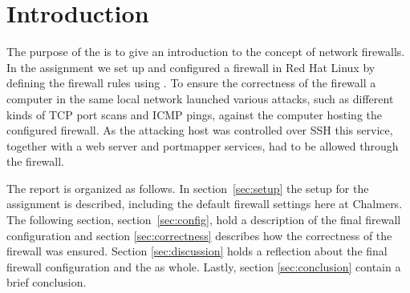 \section{Introduction} 
\label{sec:intro}

The purpose of the \lab{} is to give an introduction to the concept of network firewalls. In the assignment we set up and configured a firewall in Red Hat Linux by defining the firewall rules using . To ensure the correctness of the firewall a computer in the same local network launched various attacks, such as different kinds of TCP port scans and ICMP pings, against the computer hosting the configured firewall. As the attacking host was controlled over SSH this service, together with a web server and portmapper services, had to be allowed through the firewall. 

The report is organized as follows. In section~\ref{sec:setup} the setup for the assignment is described, including the default firewall settings here at Chalmers. The following section, section~\ref{sec:config}, hold a description of the final firewall configuration and section \ref{sec:correctness} describes how the correctness of the firewall was ensured. Section \ref{sec:discussion} holds a reflection about the final firewall configuration and the \lab{} as whole. Lastly, section \ref{sec:conclusion} contain a brief conclusion.